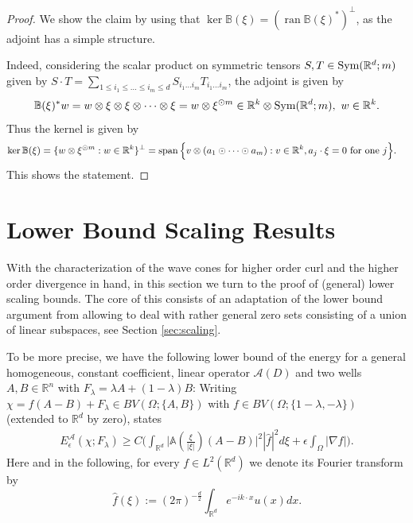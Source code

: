 \documentclass[a4paper, 10pt, twoside, notitlepage]{amsart}
\theoremstyle{plain}
\newcommand{\R}{\mathbb{R}}
\newcommand{\A}{\mathcal{A}}
\renewcommand{\AA}{\mathbb{A}}
\renewcommand{\S}[1]{\textup{Sym}(\R^d;#1)}
\begin{document}
                      \begin{proof}
                        We show the claim by using that $\ker \mathbb{B}(\xi) = (\operatorname{ran} \mathbb{B}(\xi)^\ast)^\perp$, as the adjoint has a simple structure.
                        
                  Indeed, considering the scalar product on symmetric
				tensors $S,T \in \S{m}$ given by $S \cdot T = \sum_{1\leq i_1 \leq \dots \leq i_m \leq d} S_{i_1 \dots i_m} T_{i_1 \dots i_m}$,
                  the adjoint is given by 
			\begin{align*}
				\mathbb{B}(\xi)^\ast w = w \otimes \xi \otimes \xi \otimes \dots \otimes \xi = w \otimes \xi^{\odot m} \in \R^k \otimes \S{m}, \  w \in \R^k.
			\end{align*}
			Thus the kernel is given by
			\begin{align*}
                          \ker \mathbb{B}(\xi) & = \{w \otimes \xi^{\odot m}: w \in \R^k\}^\perp  = \vspan\Big\{v \otimes (a_1 \odot \dots \odot a_m): v \in \R^k, a_j \cdot \xi = 0 \mbox{ for one } j\Big\}.
			\end{align*}
                        This shows the statement.
		\end{proof}
		
		
		
		\section{Lower Bound Scaling Results}
		\label{sec:lower}
		
		With the characterization of the wave cones for higher order curl and the higher order divergence in hand, in this section we turn to the proof of (general) lower scaling
		bounds. The core of this consists of an adaptation of the lower bound argument from \cite{RRT22} allowing to deal with rather general zero sets consisting of a union of linear subspaces, see Section
		\ref{sec:scaling}.
                
                  To be more precise, we have the following lower bound of the energy for a general homogeneous, constant coefficient, linear operator $\A(D)$ and two wells $A,B \in \R^n$ with $F_\lambda = \lambda A + (1-\lambda) B$:
                Writing $\chi = f(A-B) + F_\lambda \in BV(\Omega;\{A,B\})$ with $f \in BV(\Omega;\{1-\lambda,-\lambda\})$ (extended to $\R^d$ by zero), \cite[Corollary 3.2]{RRT22} states
                \begin{align} \label{eq:LowerBoundRRT}
                  E^{\A}_{\epsilon}(\chi;F_\lambda) \geq C \Big(\int_{\R^d} \Big|\AA(\frac{\xi}{|\xi|})(A-B)\Big|^2 |\hat{f}|^2 d\xi + \epsilon \int_\Omega |\nabla f| \Big).
                \end{align}
                Here and in the following, for every $f\in L^2(\R^d)$ we denote its Fourier transform by
                $$
                \hat f(\xi) := (2\pi)^{-\frac{d}{2}}\int_{\R^d} e^{-i k\cdot x}u(x)dx.
                $$
                
\end{document}
